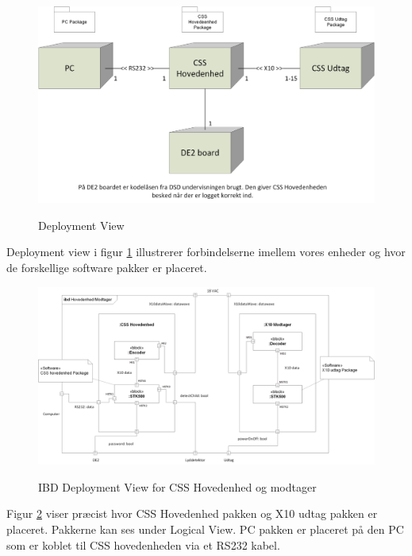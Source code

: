 
\begin{figure}[!htb]
     {\includegraphics[width=\textwidth]{billeder/uml/deployment_model}}
     \caption{Deployment View}
     \label{fig:Deployment model}
\end{figure}

Deployment view i figur \ref{fig:Deployment model} illustrerer forbindelserne imellem vores enheder og hvor de forskellige software pakker er placeret.

\begin{figure}[!htb]
     {\includegraphics[width=\textwidth]{billeder/uml/CSS_Hovedenhed_modtager_deployment}}
     \caption{IBD Deployment View for CSS Hovedenhed og modtager }
     \label{fig:IBD Deployment model}
\end{figure}

Figur \ref{fig:IBD Deployment model} viser præcist hvor CSS Hovedenhed pakken og X10 udtag pakken er placeret. Pakkerne kan ses under Logical View. PC pakken er placeret på den PC som er koblet til CSS hovedenheden via et RS232 kabel.